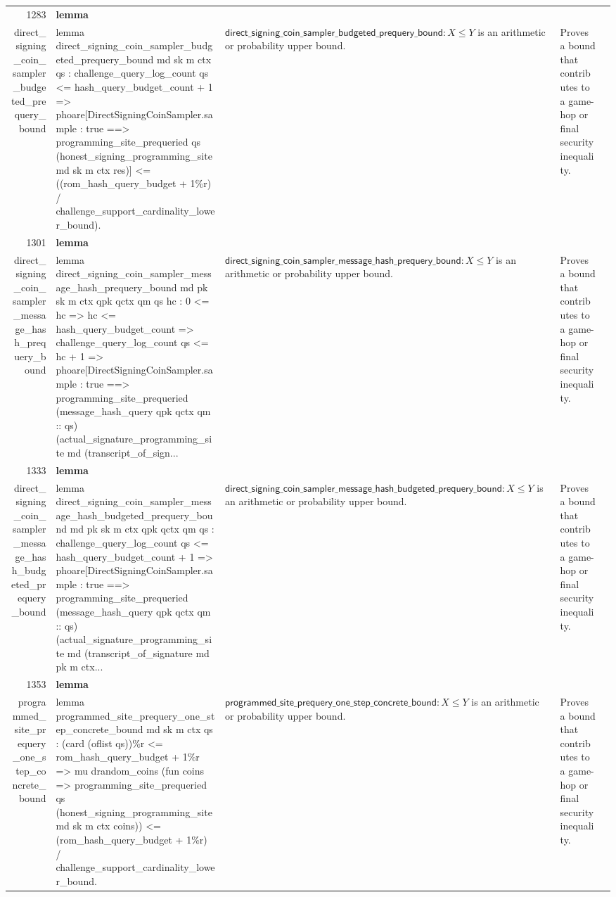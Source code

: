 \documentclass[10pt]{article}
\newcommand{\ec}[1]{\begingroup\ttfamily\scriptsize #1\endgroup}
\begin{document}
\begin{longtable}{r L{0.17\textwidth} L{0.26\textwidth} L{0.27\textwidth} L{0.20\textwidth}}
1283 & \textbf{lemma}\\\ec{direct\_signing\_coin\_sampler\_budgeted\_prequery\_bound} & \ec{lemma direct\_signing\_coin\_sampler\_budgeted\_prequery\_bound md sk m ctx qs : challenge\_query\_log\_count qs <= hash\_query\_budget\_count + 1 => phoare[DirectSigningCoinSampler.sample : true ==> programming\_site\_prequeried qs (honest\_signing\_programming\_site md sk m ctx res)] <= ((rom\_hash\_query\_budget + 1\%r) / challenge\_support\_cardinality\_lower\_bound).} & \(\mathsf{direct\_signing\_coin\_sampler\_budgeted\_prequery\_bound} : X \le Y\) is an arithmetic or probability upper bound. & Proves a bound that contributes to a game-hop or final security inequality. \\
1301 & \textbf{lemma}\\\ec{direct\_signing\_coin\_sampler\_message\_hash\_prequery\_bound} & \ec{lemma direct\_signing\_coin\_sampler\_message\_hash\_prequery\_bound md pk sk m ctx qpk qctx qm qs hc : 0 <= hc => hc <= hash\_query\_budget\_count => challenge\_query\_log\_count qs <= hc + 1 => phoare[DirectSigningCoinSampler.sample : true ==> programming\_site\_prequeried (message\_hash\_query qpk qctx qm :: qs) (actual\_signature\_programming\_site md (transcript\_of\_sign...} & \(\mathsf{direct\_signing\_coin\_sampler\_message\_hash\_prequery\_bound} : X \le Y\) is an arithmetic or probability upper bound. & Proves a bound that contributes to a game-hop or final security inequality. \\
1333 & \textbf{lemma}\\\ec{direct\_signing\_coin\_sampler\_message\_hash\_budgeted\_prequery\_bound} & \ec{lemma direct\_signing\_coin\_sampler\_message\_hash\_budgeted\_prequery\_bound md pk sk m ctx qpk qctx qm qs : challenge\_query\_log\_count qs <= hash\_query\_budget\_count + 1 => phoare[DirectSigningCoinSampler.sample : true ==> programming\_site\_prequeried (message\_hash\_query qpk qctx qm :: qs) (actual\_signature\_programming\_site md (transcript\_of\_signature md pk m ctx...} & \(\mathsf{direct\_signing\_coin\_sampler\_message\_hash\_budgeted\_prequery\_bound} : X \le Y\) is an arithmetic or probability upper bound. & Proves a bound that contributes to a game-hop or final security inequality. \\
1353 & \textbf{lemma}\\\ec{programmed\_site\_prequery\_one\_step\_concrete\_bound} & \ec{lemma programmed\_site\_prequery\_one\_step\_concrete\_bound md sk m ctx qs : (card (oflist qs))\%r <= rom\_hash\_query\_budget + 1\%r => mu drandom\_coins (fun coins => programming\_site\_prequeried qs (honest\_signing\_programming\_site md sk m ctx coins)) <= (rom\_hash\_query\_budget + 1\%r) / challenge\_support\_cardinality\_lower\_bound.} & \(\mathsf{programmed\_site\_prequery\_one\_step\_concrete\_bound} : X \le Y\) is an arithmetic or probability upper bound. & Proves a bound that contributes to a game-hop or final security inequality. \\

\end{longtable}
\end{document}
